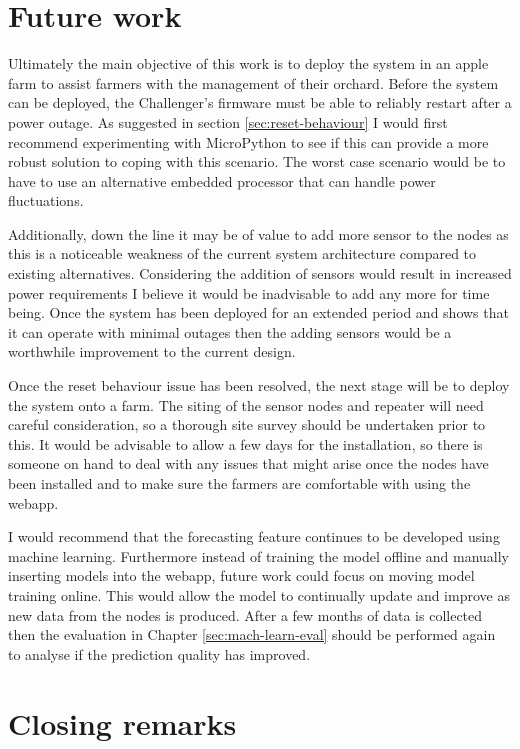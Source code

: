 \section{Future work}\label{sec:future-work}

Ultimately the main objective of this work is to deploy the system in an apple
farm to assist farmers with the management of their orchard. Before the system
can be deployed, the Challenger's firmware must be able to reliably restart
after a power outage.  As suggested in section \ref{sec:reset-behaviour} I would
first recommend experimenting with MicroPython to see if this can provide a more
robust solution to coping with this scenario. The worst case scenario would be
to have to use an alternative embedded processor that can handle power
fluctuations.

Additionally, down the line it may be of value to add more sensor to the nodes
as this is a noticeable weakness of the current system architecture compared to
existing alternatives. Considering the addition of sensors would result in
increased power requirements I believe it would be inadvisable to add any more
for time being. Once the system has been deployed for an extended period and
shows that it can operate with minimal outages then the adding sensors would be
a worthwhile improvement to the current design.

Once the reset behaviour issue has been resolved, the next stage will be to
deploy the system onto a farm.  The siting of the sensor nodes and repeater will
need careful consideration, so a thorough site survey should be undertaken prior
to this. It would be advisable to allow a few days for the installation, so
there is someone on hand to deal with any issues that might arise once the nodes
have been installed and to make sure the farmers are comfortable with using the
webapp.

I would recommend that the forecasting feature continues to be developed using
machine learning. Furthermore instead of training the model offline and manually
inserting models into the webapp, future work could focus on moving model
training online. This would allow the model to continually update and improve as
new data from the nodes is produced. After a few months of data is collected
then the evaluation in Chapter \ref{sec:mach-learn-eval} should be performed
again to analyse if the prediction quality has improved.


\section{Closing remarks}

